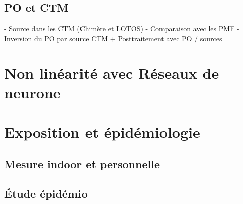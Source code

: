  


\subsection{PO et CTM}
- Source dans les CTM (Chimère et LOTOS)
- Comparaison avec les PMF
- Inversion du PO par source CTM + Posttraitement avec PO / sources

\section{Non linéarité avec Réseaux de neurone}

\section{Exposition et épidémiologie}
\subsection{Mesure indoor et personnelle}
\subsection{Étude épidémio}

